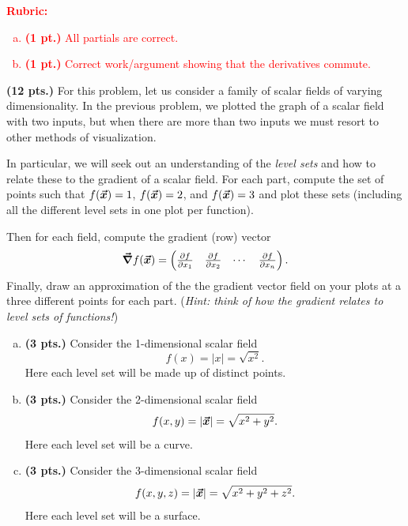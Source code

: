 \documentclass[12pt]{article} %
\begin{document}
\begin{solution}
\begin{enumerate}[(a)]
\end{enumerate}
\end{solution}
\textcolor{red}{
\noindent \textbf{Rubric:}}
\textcolor{red}{
\begin{enumerate}[(a)]
\item \textbf{(1 pt.)} All partials are correct.
\item \textbf{(1 pt.)} Correct work/argument showing that the derivatives commute.
\end{enumerate}
}


\newpage
\begin{problem}
\textbf{(12 pts.)} For this problem, let us consider a family of scalar fields of varying dimensionality. In the previous problem, we plotted the graph of a scalar field with two inputs, but when there are more than two inputs we must resort to other methods of visualization.

In particular, we will seek out an understanding of the \emph{level sets} and how to relate these to the gradient of a scalar field. For each part, compute the set of points such that $f(\boldsymbol{\vec{x}})=1$, $f(\boldsymbol{\vec{x}})=2$, and $f(\boldsymbol{\vec{x}})=3$ and plot these sets (including all the different level sets in one plot per function).

Then for each field, compute the gradient (row) vector
\[
\boldsymbol{\vec{\nabla}} f(\boldsymbol{\vec{x}}) = \begin{pmatrix} \frac{\partial f}{\partial x_1} & \frac{\partial f}{\partial x_2} & \cdots & \frac{\partial f}{\partial x_n}\end{pmatrix}.
\]
Finally, draw an approximation of the the gradient vector field on your plots at a three different points for each part. (\emph{Hint: think of how the gradient relates to level sets of functions!})
\begin{enumerate}[(a)]
	\item \textbf{(3 pts.)} Consider the 1-dimensional scalar field
	\[
	f(x) = |x| = \sqrt{x^2}.
	\]
	Here each level set will be made up of distinct points.
	\item \textbf{(3 pts.)} Consider the 2-dimensional scalar field
	\[
	f(x,y) = |\boldsymbol{\vec{x}}| = \sqrt{x^2+y^2}.
	\]
	Here each level set will be a curve.
	\item \textbf{(3 pts.)} Consider the 3-dimensional scalar field
		\[
		f(x,y,z) = |\boldsymbol{\vec{x}}| = \sqrt{x^2+y^2+z^2}.
		\]
		Here each level set will be a surface.
\end{enumerate}
\end{problem}
\end{document}
